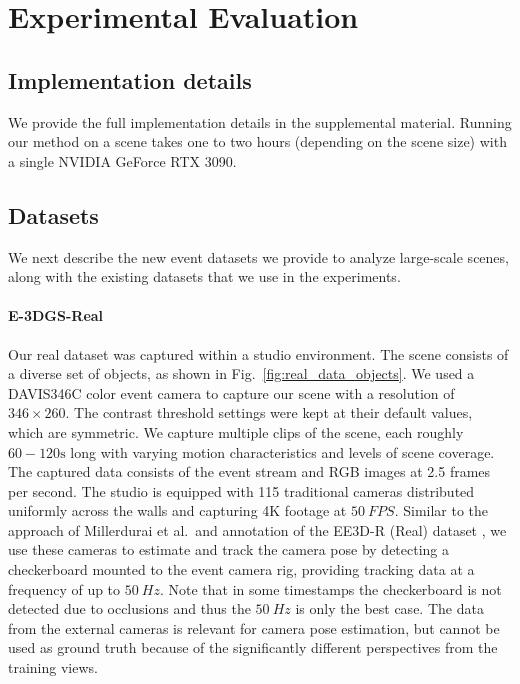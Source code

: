 \section{Experimental Evaluation}\label{sec:Experiments}

\subsection{Implementation details}

We provide the full implementation details in the supplemental material. Running our method on a scene takes one to two hours (depending on the scene size) with a single NVIDIA GeForce RTX 3090. 

\subsection{Datasets}
\label{sec:datasets}
We next describe the new event datasets we provide to analyze large-scale scenes, along with the existing datasets that we use in the experiments.  




\paragraph{E-3DGS-Real}
Our real dataset was captured within a studio environment. The scene consists of a diverse set of objects, as shown in Fig.~\ref{fig:real_data_objects}. We used a DAVIS346C color event camera to capture our scene with a resolution of $346 \times 260$. 
The contrast threshold settings were kept at their default values, which are symmetric. 
We capture multiple clips of the scene, each roughly $60{-}120\unit{\second}$ long with varying motion characteristics and levels of scene coverage. The captured data consists of the event stream and RGB images at 2.5 frames per second.
The studio is equipped with 115 traditional cameras distributed uniformly across the walls and capturing 4K footage at $\qty{50}{FPS}$.
Similar to the approach of Millerdurai et al.~and annotation of the EE3D-R (Real) dataset \cite{EventEgo3D}, we use these cameras to estimate and track the camera pose by detecting a checkerboard mounted to the event camera rig, providing tracking data at a frequency of up to $\qty{50}{Hz}$. Note that in some timestamps the checkerboard is not detected due to occlusions and thus the $\qty{50}{Hz}$ is only the best case. 
The data from the external cameras is relevant for camera pose estimation, but cannot be used as ground truth because of the significantly different perspectives from the training views.


